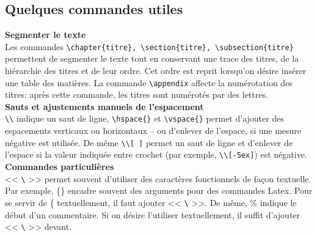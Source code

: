 \documentclass[12pt]{article}
\begin{document}
   \subsection{Quelques commandes utiles}
   
   \textbf{Segmenter le texte} \\
   Les commandes \lstinline|\chapter{titre}, \section{titre}, \subsection{titre}| permettent de segmenter le texte tout en conservant une trace des titres, de la hiérarchie des titres et de leur ordre. Cet ordre est reprit lorsqu'on désire insérer une table des matières. La commande \lstinline|\appendix| affecte la numérotation des titres: après cette commande, les titres sont numérotés par des lettres. \\
   
   \textbf{Sauts et ajustements manuels de l'espacement} \\
   \lstinline|\\| indique un saut de ligne, \lstinline|\hspace{}| et \lstinline|\vspace{}| permet d'ajouter des espacements verticaux ou horizontaux -- ou d'enlever de l'espace, si une mesure négative est utilisée. De même \lstinline|\\[ ]| permet un saut de ligne et d'enlever de l'espace si la valeur indiquée entre crochet (par exemple, \lstinline|\\[-5ex]|) est négative. \\
   
   \textbf{Commandes particulières} \\
   << \lstinline|\| >> permet souvent d'utiliser des caractères fonctionnels de façon textuelle. Par exemple, \{\} encadre souvent des arguments pour des commandes Latex. Pour se servir de \{ textuellement, il faut ajouter << \lstinline|\| >>. De même, \% indique le début d'un commentaire. Si on désire l'utiliser textuellement, il suffit d'ajouter << \lstinline|\| >> devant. \\
   
\end{document}
